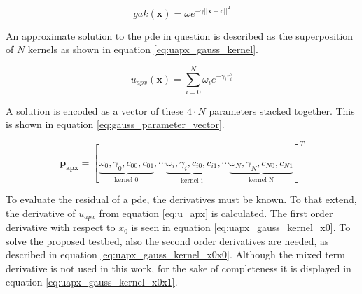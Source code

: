 \documentclass[./\jobname.tex]{subfiles}
\begin{document}
\begin{equation}
\label{eq:gauss_kernel}
gak(\mathbf{x}) = \omega e^{-\gamma ||\mathbf{x} - \mathbf{c}||^2}
\end{equation}

\begin{figure}[H]
	\centering
	\noindent{}
	\label{fig:gauss_kernel_3d_plot}
\end{figure}

An approximate solution to the \gls{pde} in question is described as the superposition of $N$ kernels as shown in equation \eqref{eq:uapx_gauss_kernel}. 

\begin{equation}
\label{eq:uapx_gauss_kernel}
u_{apx}(\mathbf{x}) = \sum_{i=0}^{N} \omega_i e^{-\gamma_i r_i^2}
\end{equation}

A solution is encoded as a vector of these $4\cdot N$ parameters stacked together. This is shown in equation \eqref{eq:gauss_parameter_vector}. 

\begin{equation}
\label{eq:gauss_parameter_vector}
\mathbf{p_{apx}} = \left[\underbrace{\omega_0, \gamma_0, c_{00}, c_{01}}_{\text{kernel 0}}, \cdots \underbrace{\omega_i, \gamma_i, c_{i0}, c_{i1}}_{\text{kernel i}}, \cdots \underbrace{\omega_N, \gamma_N, c_{N0}, c_{N1}}_{\text{kernel N}} \right]^T
\end{equation}

To evaluate the residual of a \gls{pde}, the derivatives must be known. To that extend, the derivative of $u_{apx}$ from equation \eqref{eq:u_apx} is calculated. The first order derivative with respect to $x_0$ is seen in equation \eqref{eq:uapx_gauss_kernel_x0}. To solve the proposed testbed, also the second order derivatives are needed, as described in equation \eqref{eq:uapx_gauss_kernel_x0x0}. Although the mixed term derivative is not used in this work, for the sake of completeness it is displayed in equation \eqref{eq:uapx_gauss_kernel_x0x1}.  
\end{document}

